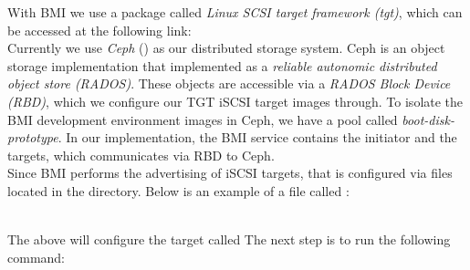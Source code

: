 With BMI we use a package called \emph{Linux SCSI target framework (tgt)}, which can be accessed at the following link:  \\

Currently we use \emph{Ceph} () as our distributed storage system.  Ceph is an object storage implementation that implemented as a \emph{reliable autonomic distributed object store (RADOS)}.  These objects are accessible via a \emph{RADOS Block Device (RBD)}, which we configure our TGT iSCSI target images through.  To isolate the BMI development environment images in Ceph, we have a pool called \emph{boot-disk-prototype}.  In our implementation, the BMI service contains the initiator and the targets, which communicates via RBD to Ceph.\\

Since BMI performs the advertising of iSCSI targets, that is configured via files located in the  directory.  Below is an example of a file called : \\



\text{} \\

The above will configure the target called  The next step is to run the following command: \\

 \\

